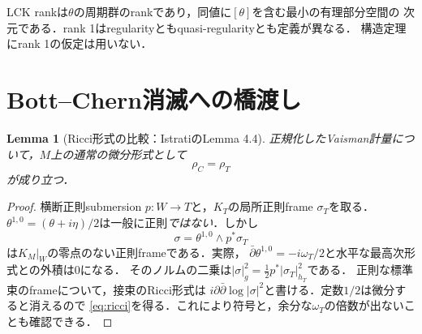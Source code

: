 \documentclass[12pt]{amsart}
\newtheorem{lem}[thm]{Lemma}
\theoremstyle{definition}
\theoremstyle{remark}
\numberwithin{equation}{section}
\newcommand{\wt}{\omega_{T}}
\newcommand{\rhoT}{\rho_{T}}
\newcommand{\rhoC}{\rho_{C}}
\begin{document}
LCK rankは$\theta$の周期群のrankであり，同値に$[\theta]$を含む最小の有理部分空間の
次元である．rank 1はregularityともquasi-regularityとも定義が異なる．
構造定理にrank 1の仮定は用いない．

\section{Bott--Chern消滅への橋渡し}\label{sec:bridge}
\begin{lem}[Ricci形式の比較：IstratiのLemma 4.4]\label{lem:ricci}
正規化したVaisman計量について，$M$上の通常の微分形式として
\begin{equation}\label{eq:ricci}
\rhoC=\rhoT
\end{equation}
が成り立つ．
\end{lem}
\begin{proof}
横断正則submersion $p:W\to T$と，$K_T$の局所正則frame $\sigma_T$を取る．
$\theta^{1,0}=(\theta+i\eta)/2$は一般に正則\emph{ではない}．しかし
\[
\sigma=\theta^{1,0}\wedge p^*\sigma_T
\]
は$K_M|_W$の零点のない正則frameである．実際，
$\bar\partial\theta^{1,0}=-i\wt/2$と水平な最高次形式との外積は0になる．
そのノルムの二乗は$|\sigma|_g^2=\tfrac12p^*|\sigma_T|_{h_T}^2$である．
正則な標準束のframeについて，接束のRicci形式は
$i\partial\bar\partial\log|\sigma|^2$と書ける．定数$1/2$は微分すると消えるので
\eqref{eq:ricci}を得る．これにより符号と，余分な$\wt$の倍数が出ないことも確認できる．
\end{proof}
\end{document}
